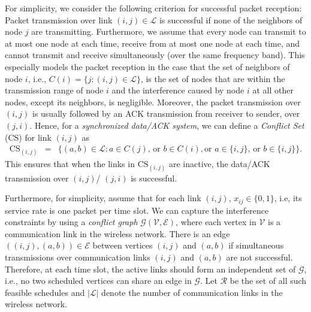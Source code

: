 \documentclass[10pt,onecolumn,draftclsnofoot,journal]{IEEEtran}
\newcommand{\be}{\begin{eqnarray}}
\newcommand{\ee}{\end{eqnarray}}
\newcommand{\cG}{\mathcal{G}}
\newcommand{\cV}{\mathcal{V}}
\newcommand{\cE}{\mathcal{E}}
\begin{document}
For simplicity, we consider the following criterion for successful packet reception: Packet transmission over link $(i,j) \in \mathcal{L}$ is successful if none of the neighbors of node $j$ are transmitting. Furthermore, we assume that every node can transmit to at most one node at each time, receive from at most one node at each time, and cannot transmit and receive simultaneously (over the same frequency band). This especially models the packet reception in the case that the set of neighbors of node $i$, i.e., $C(i)=\{j: (i,j)   \in \mathcal{L}\}$, is the set of nodes that are within the transmission range of node $i$ and the interference caused by node $i$ at all other nodes, except its neighbors, is negligible. Moreover, the packet transmission over $(i,j)$ is usually followed by an ACK transmission from receiver to sender, over $(j,i)$. Hence, for a \textit{synchronized data/ACK system}, we can define a \textit{Conflict Set} (CS) for link $(i,j)$ as
\be
\mathrm{CS}_{(i,j)} &= & \Big\{(a,b) \in \mathcal{L}:a \in C(j) \mbox{, or } b \in C(i),  \mbox{or }a \in \{i,j\} \mbox{, or } b \in \{i,j\} \Big\}.
\ee
This ensures that when the links in $\mathrm{CS}_{(i,j)}$ are inactive, the data/ACK transmission over $(i,j)$/ $(j,i)$ is successful.

Furthermore, for simplicity, assume that for each link $(i,j)$, $x_{ij} \in \{0,1\}$, i.e, its service rate is one packet per time slot.
We can capture the interference constraints by using a \textit{conflict graph} $\cG(\cV,\cE)$, where each vertex in $\cV$ is a communication link in the wireless network. There is an edge $((i,j),(a,b)) \in \cE$ between vertices $(i,j)$ and $(a,b)$ if simultaneous transmissions over communication links $(i,j)$ and $(a,b)$ are not successful. Therefore, at each time slot, the active links should form an independent set of $\cG$, i.e., no two scheduled vertices can share an edge in $\cG$. Let $\mathcal{R}$ be the set of all such feasible schedules and $|\mathcal{L}|$ denote the number of communication links in the wireless network.
\end{document}
